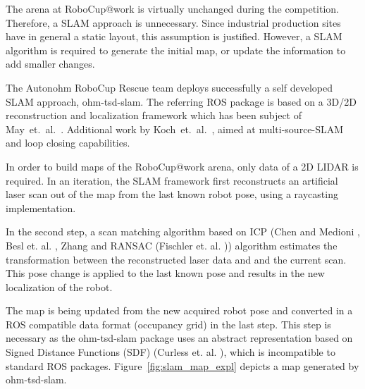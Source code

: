 
The arena at RoboCup$@$work is virtually unchanged during the competition. Therefore, a SLAM approach is unnecessary. Since industrial production sites have in general a static layout, this assumption is justified. However, a SLAM algorithm is required to generate the initial map, or update the information to add smaller changes.

The Autonohm RoboCup Rescue team deploys successfully a self developed SLAM approach, ohm-tsd-slam. The referring ROS package is based on a 3D/2D reconstruction and localization framework which has been subject of May~et.~al.~\cite{May2014}. Additional work by Koch~et.~al.~\cite{Koch2015}, aimed at multi-source-SLAM and loop closing capabilities. 

In order to build maps of the RoboCup$@$work arena, only data of a 2D LIDAR is required. In an iteration, the SLAM framework first reconstructs an artificial laser scan out of the map from the last known robot pose, using a raycasting implementation. 

In the second step, a scan matching algorithm based on ICP (Chen and Medioni \cite{chen:icp}, Besl et. al. \cite{bsl:icp}, Zhang \cite{zhang:icp} and RANSAC (Fischler et. al. \cite{Fischler:ransac})) algorithm estimates the transformation between the reconstructed laser data and and the current scan. This pose change is applied to the last known pose and results in the new localization of the robot. 

The map is being updated from the new acquired robot pose and converted in a ROS compatible data format (occupancy grid) in the last step. This step is necessary as the ohm-tsd-slam package uses an abstract representation based on Signed Distance Functions (SDF) (Curless et. al. \cite{curless:sdf}), which is incompatible to standard ROS packages. Figure~\ref{fig:slam_map_expl} depicts a map generated by ohm-tsd-slam.


